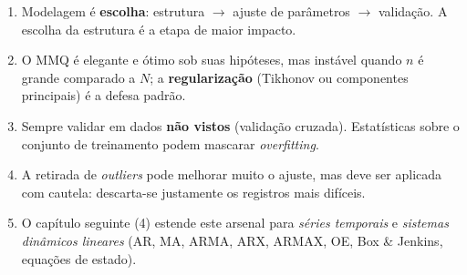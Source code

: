 \begin{enumerate}[leftmargin=1.2cm]
  \item Modelagem é \textbf{escolha}: estrutura $\rightarrow$ ajuste
        de parâmetros $\rightarrow$ validação. A escolha da estrutura
        é a etapa de maior impacto.
  \item O MMQ é elegante e ótimo sob suas hipóteses, mas instável
        quando $n$ é grande comparado a $N$; a \textbf{regularização}
        (Tikhonov ou componentes principais) é a defesa padrão.
  \item Sempre validar em dados \textbf{não vistos} (validação
        cruzada). Estatísticas sobre o conjunto de treinamento podem
        mascarar \emph{overfitting}.
  \item A retirada de \emph{outliers} pode melhorar muito o ajuste,
        mas deve ser aplicada com cautela: descarta-se justamente os
        registros mais difíceis.
  \item O capítulo seguinte (4) estende este arsenal para
        \emph{séries temporais} e \emph{sistemas dinâmicos lineares}
        (AR, MA, ARMA, ARX, ARMAX, OE, Box \& Jenkins, equações de
        estado).
\end{enumerate}


